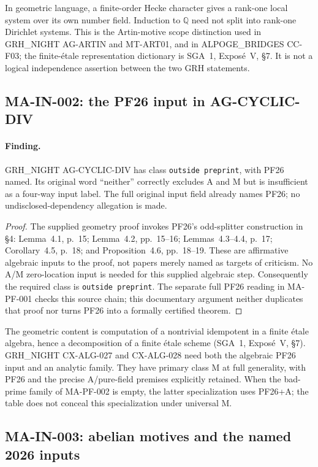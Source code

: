 In geometric language, a finite-order Hecke character gives a rank-one
local system over its own number field.  Induction to $\mathbb Q$ need
not split into rank-one Dirichlet systems.  This is the Artin-motive
scope distinction used in GRH\_NIGHT AG-ARTIN and MT-ART01, and in
ALPOGE\_BRIDGES CC-F03; the finite-\'etale representation dictionary is
SGA~1, Expos\'e~V, \S7.  It is not a logical independence assertion
between the two GRH statements.

\subsection{MA-IN-002: the PF26 input in AG-CYCLIC-DIV}

\paragraph{Finding.}
GRH\_NIGHT AG-CYCLIC-DIV has class \texttt{outside preprint}, with
PF26 named.  Its original word ``neither'' correctly excludes A and M
but is insufficient as a four-way input label.  The full original input
field already names PF26; no undisclosed-dependency allegation is made.

\begin{proof}
The supplied geometry proof invokes PF26's odd-splitter construction in
\S4: Lemma~4.1, p.~15; Lemma~4.2, pp.~15--16; Lemmas~4.3--4.4,
p.~17; Corollary~4.5, p.~18; and Proposition~4.6, pp.~18--19.
These are affirmative algebraic inputs to the proof, not papers merely
named as targets of criticism.  No A/M zero-location input is needed for
this supplied algebraic step.  Consequently the required class is
\texttt{outside preprint}.  The separate full PF26 reading in MA-PF-001
checks this source chain; this documentary argument neither duplicates
that proof nor turns PF26 into a formally certified theorem.
\end{proof}

The geometric content is computation of a nontrivial idempotent in a
finite \'etale algebra, hence a decomposition of a finite \'etale
scheme (SGA~1, Expos\'e~V, \S7).  GRH\_NIGHT CX-ALG-027 and
CX-ALG-028 need both the algebraic PF26 input and an analytic family.
They have primary class M at full generality, with PF26 and the precise
A/pure-field premises explicitly retained.  When the bad-prime family
of MA-PF-002 is empty, the latter specialization uses PF26+A; the table
does not conceal this specialization under universal M.

\subsection{MA-IN-003: abelian motives and the named 2026 inputs}

